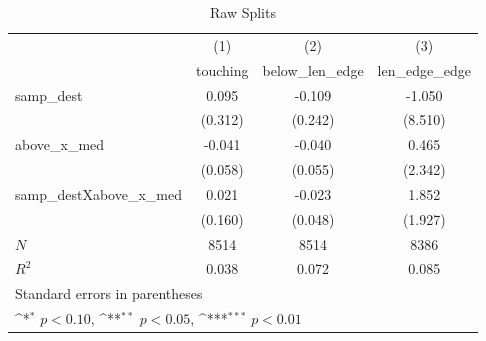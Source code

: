 \begin{table}[htbp]\centering
\def\sym#1{\ifmmode^{#1}\else\(^{#1}\)\fi}
\caption{Raw Splits}
\begin{tabular}{l*{3}{c}}
\hline\hline
            &\multicolumn{1}{c}{(1)}&\multicolumn{1}{c}{(2)}&\multicolumn{1}{c}{(3)}\\
            &\multicolumn{1}{c}{touching}&\multicolumn{1}{c}{below\_len\_edge}&\multicolumn{1}{c}{len\_edge\_edge}\\
\hline
samp\_dest   &       0.095         &      -0.109         &      -1.050         \\
            &     (0.312)         &     (0.242)         &     (8.510)         \\
[1em]
above\_x\_med &      -0.041         &      -0.040         &       0.465         \\
            &     (0.058)         &     (0.055)         &     (2.342)         \\
[1em]
samp\_destXabove\_x\_med&       0.021         &      -0.023         &       1.852         \\
            &     (0.160)         &     (0.048)         &     (1.927)         \\
\hline
\(N\)       &        8514         &        8514         &        8386         \\
\(R^{2}\)   &       0.038         &       0.072         &       0.085         \\
\hline\hline
\multicolumn{4}{l}{\footnotesize Standard errors in parentheses}\\
\multicolumn{4}{l}{\footnotesize \sym{*} \(p<0.10\), \sym{**} \(p<0.05\), \sym{***} \(p<0.01\)}\\
\end{tabular}
\end{table}
